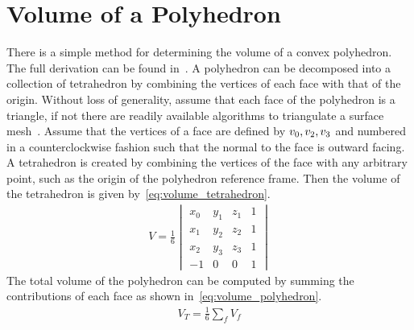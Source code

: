
\chapter{Volume of a Polyhedron}\label{sec:polyhedron_volume}

There is a simple method for determining the volume of a convex polyhedron.
The full derivation can be found in~\textcite{newson1899,orourke1998}.
A polyhedron can be decomposed into a collection of tetrahedron by combining the vertices of each face with that of the origin.
Without loss of generality, assume that each face of the polyhedron is a triangle, if not there are readily available algorithms to triangulate a surface mesh~\cite{berg2008}.
Assume that the vertices of a face are defined by \( v_0, v_2, v_3 \) and numbered in a counterclockwise fashion such that the normal to the face is outward facing.
A tetrahedron is created by combining the vertices of the face with any arbitrary point, such as the origin of the polyhedron reference frame.
Then the volume of the tetrahedron is given by~\cref{eq:volume_tetrahedron}.
\begin{align}\label{eq:volume_tetrahedron}
    V = \frac{1}{6} 
    \begin{vmatrix} 
        x_0 & y_1 & z_1 & 1 \\
        x_1 & y_2 & z_2 & 1 \\
        x_2 & y_3 & z_3 & 1 \\
        -1 & 0 & 0 & 1
    \end{vmatrix}
\end{align}
The total volume of the polyhedron can be computed by summing the contributions of each face as shown in~\cref{eq:volume_polyhedron}.
\begin{align}\label{eq:volume_polyhedron}
    V_T = \frac{1}{6} \sum_{f} V_f
\end{align}
